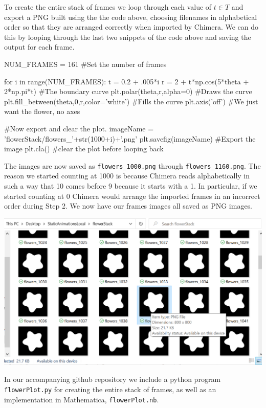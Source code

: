 \documentclass[12 pt]{article}
\begin{document}
To create the entire stack of frames we loop through each value of $t\in T$ and export a PNG built using the the code above, choosing filenames in alphabetical order so that they are arranged correctly when imported by Chimera.  We can do this by looping through the last two snippets of the code above and saving the output for each frame.
\begin{python}
NUM_FRAMES = 161 #Set the number of frames

for i in range(NUM_FRAMES):
  t = 0.2 + .005*i
  r = 2 + t*np.cos(5*theta + 2*np.pi*t) #The boundary curve
  plt.polar(theta,r,alpha=0) #Draws the curve
  plt.fill_between(theta,0,r,color='white') #Fills the curve
  plt.axis('off') #We just want the flower, no axes

  #Now export and clear the plot.
  imageName = 'flowerStack/flowers_'+str(1000+i)+'.png'
  plt.savefig(imageName) #Export the image
  plt.cla() #clear the plot before looping back
\end{python}
The images are now saved as \verb|flowers_1000.png| through \verb|flowers_1160.png|.  The reason we started counting at 1000 is because Chimera reads alphabetically in such a way that 10 comes before 9 because it starts with a 1.  In particular, if we started counting at 0 Chimera would arrange the imported frames in an incorrect order during Step 2.  We now have our frames images all saved as PNG images.
\begin{center}
    \includegraphics[width=.45\paperwidth]{images/list_of_files.png}
\end{center}
In our accompanying github repository \cite{github} we include a python program \verb|flowerPlot.py| for creating the entire stack of frames, as well as an implementation in Mathematica, \verb|flowerPlot.nb|.
\end{document}
